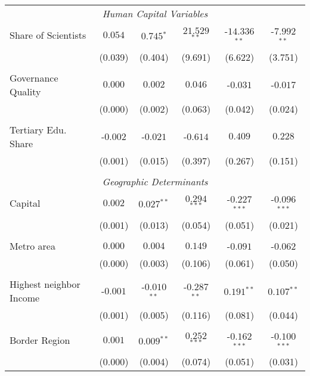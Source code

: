 \documentclass[11pt]{article}
\begin{document}
\begin{table}[!htbp]
{\begin{minipage}{\textwidth}
\begin{tabular}{@{\extracolsep{5pt}} lccccc}
\\
\multicolumn{6}{c}{\textit{Human Capital Variables}}\\
Share of Scientists & $0.054$ & $0.745$$^{*}$ & $21.529$$^{**}$ & $ $-$14.336$$^{**}$ & $ $-$7.992$$^{**}$ \\
& (0.039) &  (0.404) & (9.691) & (6.622) & (3.751)\\
&\\
Governance Quality & $0.000$ & $0.002$ & $0.046$ & $ $-$0.031$ & $ $-$0.017$ \\
& (0.000) &  (0.002) & (0.063) & (0.042) & (0.024)\\
&\\
Tertiary Edu. Share  & $ $-$0.002$ & $ $-$0.021$ & $ $-$0.614$ & $0.409$ & $0.228$ \\
& (0.001) &  (0.015) & (0.397) & (0.267) & (0.151)\\
\\
\multicolumn{6}{c}{\textit{Geographic Determinants}}\\
Capital & $0.002$ & $0.027$$^{**}$ & $0.294$$^{***}$ & $ $-$0.227$$^{***}$ & $ $-$0.096$$^{***}$ \\
& (0.001) &  (0.013) & (0.054) & (0.051) & (0.021)\\
&\\
Metro area & $0.000$ & $0.004$ & $0.149$ & $ $-$0.091$ & $ $-$0.062$ \\ 
& (0.000) &  (0.003) & (0.106) & (0.061) & (0.050)\\
&\\
Highest neighbor Income & $ $-$0.001$ & $ $-$0.010$$^{**}$ & $ $-$0.287$$^{**}$ & $0.191$$^{**}$ & $0.107$$^{**}$ \\
& (0.001) &  (0.005) & (0.116) & (0.081) & (0.044)\\
&\\
Border Region & $0.001$ & $0.009$$^{**}$ & $0.252$$^{***}$ & $ $-$0.162$$^{***}$ & $ $-$0.100$$^{***}$ \\ 
& (0.000) &  (0.004) & (0.074) & (0.051) & (0.031)\\


\end{tabular}
\end{minipage}}
\end{table}
\end{document}
